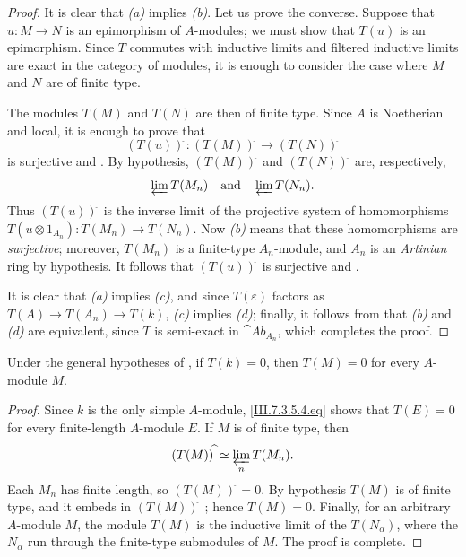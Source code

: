 \begin{proof}
It is clear that \emph{(a)} implies \emph{(b)}.  Let us prove the converse.
Suppose that $u:M\to N$ is an epimorphism of $A$-modules; we
must show that $T(u)$ is an epimorphism.  Since $T$ commutes
with inductive limits and filtered inductive limits are exact
in the category of modules, it is enough to consider the case
where $M$ and $N$ are of finite type.

The modules $T(M)$ and $T(N)$ are then of finite type.  Since
$A$ is Noetherian and local, it is enough to prove that
\[
  (T(u))^{\widehat{\,}}:
  (T(M))^{\widehat{\,}}
  \longrightarrow
  (T(N))^{\widehat{\,}}
\]
is surjective  and .
By hypothesis, $(T(M))^{\widehat{\,}}$ and $(T(N))^{\widehat{\,}}$ are,
respectively,
\[
  \varprojlim T(M_n)
  \quad\hbox{and}\quad
  \varprojlim T(N_n).
\]
Thus $(T(u))^{\widehat{\,}}$ is the inverse limit of the projective
system of homomorphisms $T(u\otimes1_{A_n}):T(M_n)\longrightarrow T(N_n)$.
Now \emph{(b)} means that these homomorphisms are
\emph{surjective}; moreover, $T(M_n)$ is a finite-type
$A_n$-module, and $A_n$ is an \emph{Artinian} ring by hypothesis.  It follows that
$(T(u))^{\widehat{\,}}$ is surjective  and
.

It is clear that \emph{(a)} implies \emph{(c)}, and since $T(\varepsilon)$
factors as
$T(A)\longrightarrow T(A_n)\longrightarrow T(k)$,
\emph{(c)} implies \emph{(d)}; finally, it follows from 
that \emph{(b)} and \emph{(d)} are equivalent, since $T$ is semi-exact in
$\cat{Ab}_{A_n}$, which completes the proof.
\end{proof}

\begin{corollary}[7.5.3]
\label{III.7.5.3}
Under the general hypotheses of , if
$T(k)=0$, then $T(M)=0$ for every $A$-module $M$.
\end{corollary}

\begin{proof}
Since $k$ is the only simple $A$-module,
\eqref{III.7.3.5.4.eq} shows that $T(E)=0$ for every
finite-length $A$-module $E$.  If $M$ is of finite type, then
\[
  (T(M))^{\widehat{\,}}
  \simeq
  \varprojlim_n T(M_n).
\]
Each $M_n$ has finite length, so $(T(M))^{\widehat{\,}}=0$.  By
hypothesis $T(M)$ is of finite type, and it embeds in
$(T(M))^{\widehat{\,}}$ ; hence $T(M)=0$.
Finally, for an arbitrary $A$-module $M$, the module $T(M)$
is the inductive limit of the $T(N_\alpha)$, where the
$N_\alpha$ run through the finite-type submodules of $M$.
The proof is complete.
\end{proof}

